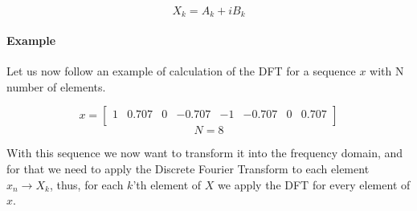 \documentclass[
  oneside,
  11pt, a4paper,
  footinclude=true,
  headinclude=true,
  cleardoublepage=empty
]{scrbook}
\begin{document}
\begin{equation*}
    X_{k} = A_{k} + i B_{k}
\end{equation*}


\paragraph{Example} \label{example1} Let us now follow an example of calculation of the DFT for a sequence \(x\) with N number of elements.


\begin{equation*}
    x = 
    \begin{bmatrix}
        1 & 0.707 & 0 & -0.707 & -1 & -0.707 & 0 & 0.707\\
    \end{bmatrix}
\end{equation*}
\begin{equation*}
    N = 8
\end{equation*}

With this sequence we now want to transform it into the frequency domain, and for that we need to apply the Discrete Fourier Transform to each element \( x_{n} \rightarrow X_{k} \), thus, for each \(k\)'th element of \(X\) we apply the DFT for every element of \(x\).
\end{document}
